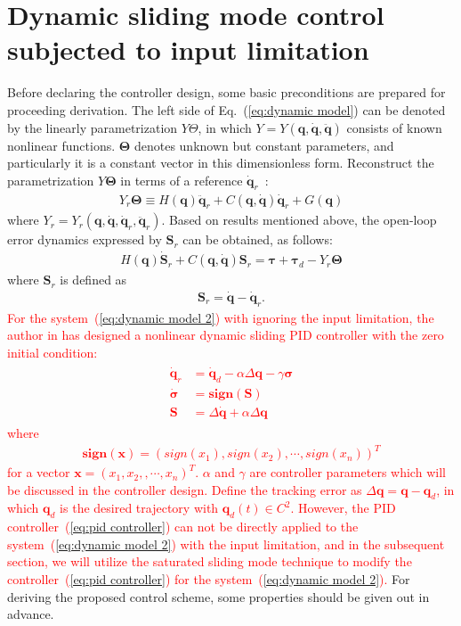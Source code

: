 \documentclass[3p]{elsarticle}
\theoremstyle{plain}
\theoremstyle{remark}
\begin{document}
\section{Dynamic sliding mode control subjected to input limitation}\label{sec:3}
Before declaring the controller design, some basic preconditions are prepared for proceeding derivation.  The left side of Eq.~(\ref{eq:dynamic model}) can be denoted by the linearly parametrization $Y\Theta$, in which $Y=Y(\bm q,\dot {\bm q},\ddot {\bm q})$ consists of known nonlinear functions. $\bm\Theta$ denotes unknown but constant parameters, and particularly it is a constant vector in this dimensionless form. Reconstruct the parametrization $Y\bm\Theta$ in terms of a reference $\dot{\bm q}_r$~\cite{parra2003dynamic}:
\begin{align}
 Y_r\bm\Theta\equiv H(\bm q)\ddot {\bm q}_r+C(\bm q,\dot {\bm q})\dot {\bm q}_r+G(\bm q)\label{eq:dynamic model 1}
\end{align}
where $Y_r = Y_r(\bm q,\dot{\bm q},\dot{\bm q}_r,\ddot{\bm q}_r)$. Based on results mentioned above, the open-loop error dynamics expressed by $\bm S_r$ can be obtained, as follows:
\begin{align}
H(\bm q)\dot {\bm S}_r+C(\bm q,\dot{\bm q})\bm S_r=\bm\tau +\bm\tau_d- Y_r\bm\Theta\label{eq:dynamic model 2}
\end{align}
where $\bm S_r$ is defined as
\begin{align}
\bm S_r=\dot {\bm q}-\dot {\bm q}_r.\label{eq:Sr1}
\end{align}
\textcolor{red}{For the system~(\ref{eq:dynamic model 2}) with ignoring the input limitation, the author in \cite{parra2003dynamic} has designed a nonlinear dynamic sliding PID controller with the zero initial condition:
\begin{align}\begin{split}
\dot {\bm q}_r&=\dot{\bm q}_d-\alpha\Delta\bm q-\gamma\bm\sigma\\
\dot{\bm\sigma}&=\bm{sign}(\bm S)\\
\bm S&=\Delta\dot{\bm q}+\alpha\Delta\bm q\label{eq:pid controller}
\end{split}\end{align}
where
\begin{align}
\bm{sign}(\bm x) = \left(sign(x_1),sign(x_2),\cdots,sign(x_n)\right)^T
\end{align}
for a vector $\bm x=\left(x_1,x_2,,\cdots,x_n\right)^T$. $\alpha$ and $\gamma$ are controller parameters which will be discussed in the controller design. Define the tracking error as $\Delta \bm q=\bm q-\bm q_d$, in which $\bm q_d$ is the desired trajectory with $\bm q_d(t)\in C^2$. However, the PID controller~(\ref{eq:pid controller}) can not be directly applied to the system~(\ref{eq:dynamic model 2}) with the input limitation, and in the subsequent section, we will utilize the saturated sliding mode technique to modify the controller~(\ref{eq:pid controller}) for the system~(\ref{eq:dynamic model 2}).} For deriving the proposed control scheme, some properties should be given out in advance.
\end{document}
